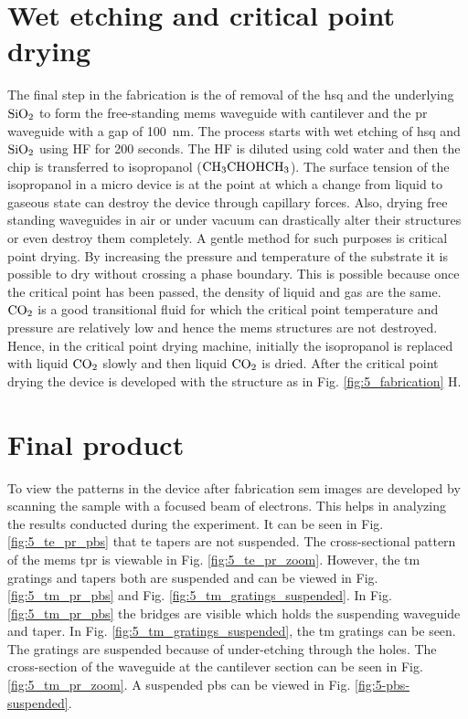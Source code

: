 \documentclass[../report.tex]{subfiles}
\begin{document}
\section{Wet etching and critical point drying}
The final step in the fabrication is the of removal of the \gls{hsq} and the underlying $\mathrm{SiO_2}$ to form the free-standing \gls{mems} waveguide with cantilever and the \gls{pr} waveguide with a gap of \SI{100}{\nano \meter}. The process starts with wet etching of \gls{hsq} and $\mathrm{SiO_2}$ using HF for 200 seconds. The HF is diluted using cold water and then the chip is transferred to isopropanol ($\mathrm{CH_3CHOHCH_3}$). The surface tension of the isopropanol in a micro device is at the point at which a change from liquid to gaseous state can destroy the device through capillary forces. Also, drying free standing waveguides in air or under vacuum can drastically alter their structures or even destroy them completely. A gentle method for such purposes is critical point drying. By increasing the pressure and temperature of the substrate it is possible to dry without crossing a phase boundary. This is possible because once the critical point has been passed, the density of liquid and gas are the same. $\mathrm{CO_2}$ is a good transitional fluid for which the critical point temperature and pressure are relatively low and hence the \gls{mems} structures are not destroyed. Hence, in the critical point drying machine, initially the isopropanol is replaced with liquid $\mathrm{CO_2}$ slowly and then liquid $\mathrm{CO_2}$ is dried. After the critical point drying the device is developed with the structure as in Fig. \ref{fig:5_fabrication} H. 

\section{Final product}

To view the patterns in the device after fabrication \gls{sem} images are developed by scanning the sample with a focused beam of electrons. This helps in analyzing the results conducted during the experiment. It can be seen in Fig. \ref{fig:5_te_pr_pbs} that \gls{te} tapers are not suspended. The cross-sectional pattern of the \gls{mems} \gls{tpr} is viewable in Fig. \ref{fig:5_te_pr_zoom}. However, the \gls{tm} gratings and tapers both are suspended and can be viewed in Fig. \ref{fig:5_tm_pr_pbs} and Fig. \ref{fig:5_tm_gratings_suspended}. In Fig. \ref{fig:5_tm_pr_pbs} the bridges are visible which holds the suspending waveguide and taper. In Fig. \ref{fig:5_tm_gratings_suspended}, the \gls{tm} gratings can be seen. The gratings are suspended because of under-etching through the holes. The cross-section of the waveguide at the cantilever section can be seen in Fig. \ref{fig:5_tm_pr_zoom}. A suspended \gls{pbs} can be viewed in Fig. \ref{fig:5-pbs-suspended}.
\end{document}
